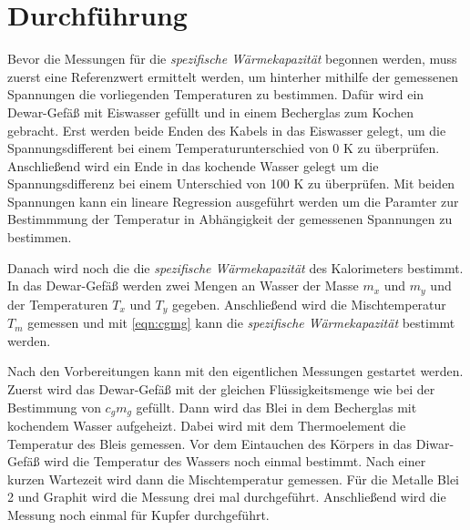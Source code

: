\section{Durchführung}

Bevor die Messungen für die \emph{spezifische Wärmekapazität} begonnen werden,
muss zuerst eine Referenzwert ermittelt werden, um hinterher mithilfe der gemessenen
Spannungen die vorliegenden Temperaturen zu bestimmen. Dafür wird ein Dewar-Gefäß
mit Eiswasser gefüllt und in einem Becherglas zum Kochen gebracht. Erst werden
beide Enden des Kabels in das Eiswasser gelegt, um die Spannungsdifferent bei
einem Temperaturunterschied von 0 K zu überprüfen. Anschließend wird ein Ende in
das kochende Wasser gelegt um die Spannungsdifferenz bei einem Unterschied von
100 K zu überprüfen. Mit beiden Spannungen kann ein lineare Regression ausgeführt
werden um die Paramter zur Bestimmmung der Temperatur in Abhängigkeit der
gemessenen Spannungen zu bestimmen.

Danach wird noch die die \emph{spezifische Wärmekapazität} des Kalorimeters bestimmt.
In das Dewar-Gefäß werden zwei Mengen an Wasser der Masse $m_x$ und $m_y$ und der
Temperaturen $T_x$ und $T_y$ gegeben. Anschließend wird die Mischtemperatur
$T_m$ gemessen und mit \eqref{eqn:cgmg} kann die \emph{spezifische Wärmekapazität}
bestimmt werden.

Nach den Vorbereitungen kann mit den eigentlichen Messungen gestartet werden.
Zuerst wird das Dewar-Gefäß mit der gleichen Flüssigkeitsmenge wie bei der
Bestimmung von $c_g m_g$ gefüllt. Dann wird das Blei in dem Becherglas mit kochendem
Wasser aufgeheizt. Dabei wird mit dem Thermoelement die Temperatur des Bleis
gemessen. Vor dem Eintauchen des Körpers in das Diwar-Gefäß wird die
Temperatur des Wassers noch einmal bestimmt. Nach einer kurzen Wartezeit wird
dann die Mischtemperatur gemessen.
Für die Metalle Blei 2 und Graphit wird die Messung drei mal durchgeführt.
Anschließend wird die Messung noch einmal für Kupfer durchgeführt.


